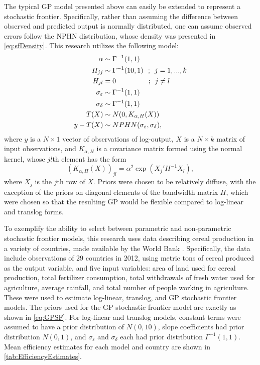 \documentclass[twocolumn]{article}
\newcommand{\ep}{\varepsilon}
\begin{document}
The typical GP model presented above can easily be extended to represent a stochastic frontier. Specifically, rather than assuming the difference between observed and predicted output is normally distributed, one can assume observed errors follow the NPHN distribution, whose density was presented in \cref{eq:sfDensity}. This research utilizes the following model:
\begin{subequations}
\label{eq:GPSF}
\begin{align}
	\alpha&\sim \Gamma^{-1}(1, 1)\\
	H_{jj}&\sim \Gamma^{-1}(10, 1) \mbox{\ \ ;\ \ }j=1,...,k\\
	H_{jl} &= 0 \mbox{\hspace*{4.3em} ;\ \ }j\neq l\\
	\sigma_\ep &\sim \Gamma^{-1}(1, 1)\\
	\sigma_\delta &\sim \Gamma^{-1}(1, 1)\\
	T(X)&\sim N(0, K_{\alpha, H}(X))\\
	y - T(X)&\sim NPHN(\sigma_\ep, \sigma_\delta),
\end{align}
\end{subequations}
where $y$ is a $N\times 1$ vector of observations of log-output, $X$ is a $N\times k$ matrix of input observations, and $K_{\alpha, H}$ is a covariance matrix formed using the normal kernel, whose $jl$th element has the form
\begin{equation}
	\left(K_{\alpha, H}(X)\right)_{jl} = \alpha^2 \exp\left(X_j' H^{-1} X_l\right),
\end{equation}
where $X_j$ is the $j$th row of $X$. Priors were chosen to be relatively diffuse, with the exception of the priors on diagonal elements of the bandwidth matrix $H$, which were chosen so that the resulting GP would be flexible compared to log-linear and translog forms.

To exemplify the ability to select between parametric and non-parametric stochastic frontier models, this research uses data describing cereal production in a variety of countries, made available by the World Bank \citep{WorldBank}. Specifically, the data include observations of 29 countries in 2012, using metric tons of cereal produced as the output variable, and five input variables: area of land used for cereal production, total fertilizer consumption, total withdrawals of fresh water used for agriculture, average rainfall, and total number of people working in agriculture. These were used to estimate log-linear, translog, and GP stochastic frontier models. The priors used for the GP stochastic frontier model are exactly as shown in \cref{eq:GPSF}. For log-linear and translog models, constant terms were assumed to have a prior distribution of $N(0, 10)$, slope coefficients had prior distribution $N(0, 1)$, and $\sigma_\ep$ and $\sigma_\delta$ each had prior distribution $\Gamma^{-1}(1, 1)$. Mean efficiency estimates for each model and country are shown in \cref{tab:EfficiencyEstimates}.
\end{document}
